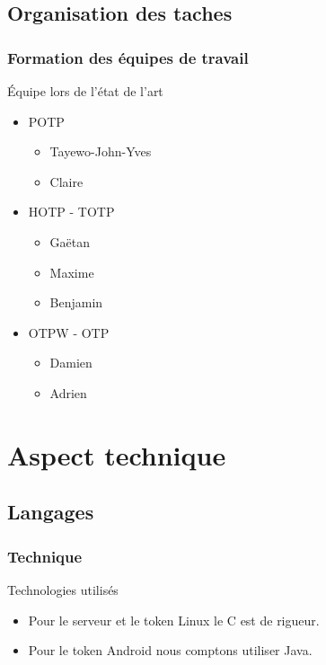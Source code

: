 \documentclass[xcolor=table]{beamer}
\begin{document}
\subsection{Organisation des taches}
\begin{frame}
\frametitle{Formation des équipes de travail}
\begin{block}{Équipe lors de l'état de l'art}
  \begin{itemize}
    \item POTP
    \begin{itemize}
      \item Tayewo-John-Yves 
      \item Claire 
    \end{itemize}
    \item HOTP - TOTP
    \begin{itemize}
      \item Gaëtan 
      \item Maxime 
      \item Benjamin 
    \end{itemize}
    \item OTPW - OTP
    \begin{itemize}
      \item Damien 
      \item Adrien 
    \end{itemize}
  \end{itemize}
\end{block}
\end{frame}



\section{Aspect technique}

\subsection{Langages}
\begin{frame}
\frametitle{Technique}
\begin{block}{Technologies utilisés}
\begin{itemize}
  \item Pour le serveur et le token Linux le C est de rigueur.
  \item Pour le token Android nous comptons utiliser Java. 
\end{itemize}
\end{block}
\end{frame}
\end{document}
